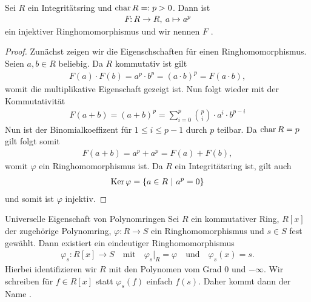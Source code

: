 \begin{lemma}\label{skript:8.7}
	Sei $R$ ein Integritätsring und $\operatorname{char} R =: p > 0$.
	Dann ist
	\begin{align*}
	F : R \to R, \ a \mapsto a^p
	\end{align*}
	ein injektiver Ringhomomorphismus und wir nennen $F$ . 
\end{lemma}

\begin{proof}
	Zunächst zeigen wir die Eigenschschaften für einen Ringhomomorphismus.
	Seien $a,b \in R$ beliebig.
	Da $R$ kommutativ ist gilt
	\begin{align*}
	F(a) \cdot F(b) = a^p \cdot b^p = (a\cdot b)^p = F(a \cdot b),
	\end{align*}
	womit die multiplikative Eigenschaft gezeigt ist.
	Nun folgt wieder mit der Kommutativität
	\begin{align*}
	F(a+b) = (a+b)^p
	= \sum \limits_{i=0}^p \binom{p}{i} \cdot a^i \cdot b^{p-i}
	\end{align*}
	Nun ist der Binomialkoeffizent für $ 1 \leq i \leq p-1$ durch $p$ teilbar.
	Da $\operatorname{char} R = p$ gilt folgt somit
	\begin{align*}
	F(a+b)  = a^p + a^p = F(a) + F(b),
	\end{align*}
	womit $\varphi$ ein Ringhomomorphismus ist.
	Da $R$ ein Integritätsring ist, gilt auch
	\begin{align*}
	\operatorname{Ker} \varphi = \lbrace a \in R \ | \ a^p = 0 \rbrace
	\end{align*}
	und somit ist $\varphi$ injektiv.			
\end{proof}

\begin{genericthm}{Universelle Eigenschaft von Polynomringen}\label{skript:8.8}
	Sei $ R $ ein kommutativer Ring, $ R[x] $ der zugehörige Polynomring,
	$ \varphi : R \to S $ ein Ringhomomorphismus und $ s \in S $ fest gewählt.
	Dann existiert ein eindeutiger Ringhomomorphismus
	\begin{align*}
	\varphi_s : R[x] \to S \quad \text{mit} \quad \varphi_s \Big|_R = \varphi \quad
	\text{und} \quad \varphi_s(x) = s.
 	\end{align*}
 	Hierbei identifizieren wir $ R $ mit den Polynomen vom Grad $ 0 $ und $ - \infty $.
	Wir schreiben für $ f \in R[x] $ statt $ \varphi_s(f) $ einfach $ f(s) $.
	Daher kommt dann der Name .
\end{genericthm}

